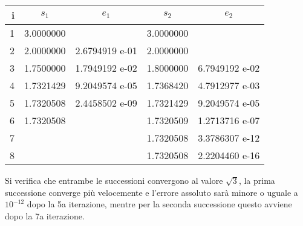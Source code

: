 \begin{tabular}{ r | c | c | c | c }
		
  \textbf{i} & \textbf{$s_1$} & \textbf{$e_1$} & \textbf{$s_2$} & \textbf{$e_2$} \\
  \hline	
  	1 & 3.0000000 &                & 3.0000000 &               \\
	2 & 2.0000000 & 2.6794919 e-01 & 2.0000000 &               \\
	3 & 1.7500000 & 1.7949192 e-02 & 1.8000000 & 6.7949192 e-02\\
	4 & 1.7321429 & 9.2049574 e-05 & 1.7368420 & 4.7912977 e-03\\
	5 & 1.7320508 & 2.4458502 e-09 & 1.7321429 & 9.2049574 e-05\\
	6 & 1.7320508 &                & 1.7320509 & 1.2713716 e-07\\
	7 &           &                & 1.7320508 & 3.3786307 e-12\\
	8 &           &                & 1.7320508 & 2.2204460 e-16\\
  \hline  
\end{tabular}

Si verifica che entrambe le successioni convergono al valore $\sqrt{3}$, la prima successione converge più velocemente e l'errore assoluto sarà minore o uguale a $10^{-12}$ dopo la 5a iterazione, mentre per la seconda successione questo avviene dopo la 7a iterazione.